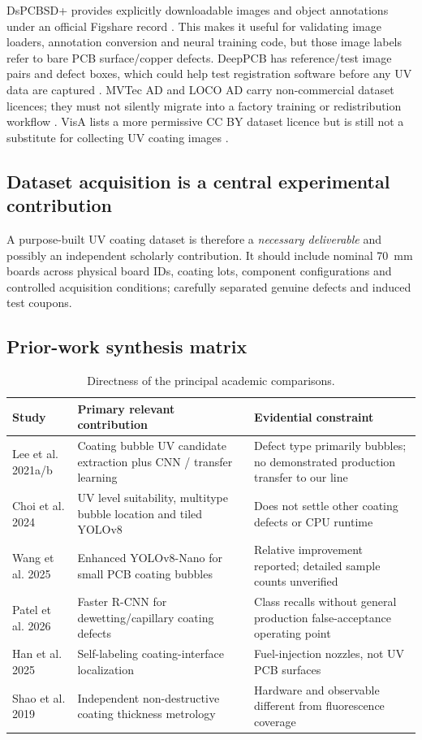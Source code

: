 DsPCBSD+ provides explicitly downloadable images and object annotations under an official Figshare record \citep{dspcbfigshare}. This makes it useful for validating image loaders, annotation conversion and neural training code, but those image labels refer to bare PCB surface/copper defects. DeepPCB has reference/test image pairs and defect boxes, which could help test registration software before any UV data are captured \citep{tang2019deeppcb}. MVTec AD and LOCO AD carry non-commercial dataset licences; they must not silently migrate into a factory training or redistribution workflow \citep{mvtecdataset,bergmann2022loco}. VisA lists a more permissive CC BY dataset licence but is still not a substitute for collecting UV coating images \citep{visa2022dataset}.

\subsection{Dataset acquisition is a central experimental contribution}
A purpose-built UV coating dataset is therefore a \emph{necessary deliverable} and possibly an independent scholarly contribution. It should include nominal 70~mm boards across physical board IDs, coating lots, component configurations and controlled acquisition conditions; carefully separated genuine defects and induced test coupons.

\subsection{Prior-work synthesis matrix}
\begin{table}[htbp]\centering\scriptsize
\caption{Directness of the principal academic comparisons.}\label{tab:prior}
\begin{tabularx}{\textwidth}{p{28mm}X p{25mm}}\toprule
Study & Primary relevant contribution & Evidential constraint\\\midrule
Lee et al. 2021a/b \citep{lee2021cnn,lee2021transfer} & Coating bubble UV candidate extraction plus CNN / transfer learning & Defect type primarily bubbles; no demonstrated production transfer to our line\\
Choi et al. 2024 \citep{choi2024uv} & UV level suitability, multitype bubble location and tiled YOLOv8 & Does not settle other coating defects or CPU runtime\\
Wang et al. 2025 \citep{wang2025bubble} & Enhanced YOLOv8-Nano for small PCB coating bubbles & Relative improvement reported; detailed sample counts unverified\\
Patel et al. 2026 \citep{patel2026coverage} & Faster R-CNN for dewetting/capillary coating defects & Class recalls without general production false-acceptance operating point\\
Han et al. 2025 \citep{han2025coating} & Self-labeling coating-interface localization & Fuel-injection nozzles, not UV PCB surfaces\\
Shao et al. 2019 \citep{shao2019oct} & Independent non-destructive coating thickness metrology & Hardware and observable different from fluorescence coverage\\
\bottomrule\end{tabularx}
\end{table}
